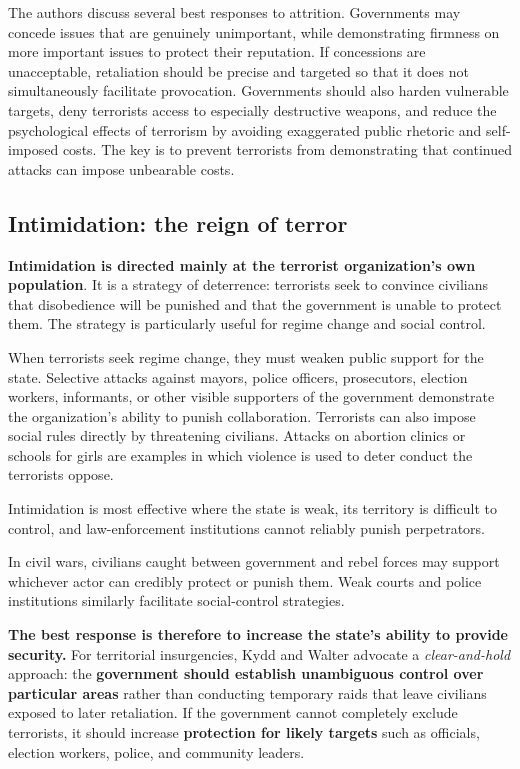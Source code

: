 The authors discuss several best responses to attrition. Governments may concede issues that are genuinely unimportant, while demonstrating firmness on more important issues to protect their reputation. If concessions are unacceptable, retaliation should be precise and targeted so that it does not simultaneously facilitate provocation. Governments should also harden vulnerable targets, deny terrorists access to especially destructive weapons, and reduce the psychological effects of terrorism by avoiding exaggerated public rhetoric and self-imposed costs. The key is to prevent terrorists from demonstrating that continued attacks can impose unbearable costs.

\subsection{Intimidation: the reign of terror}

\textbf{Intimidation is directed mainly at the terrorist organization's own population}. It is a strategy of deterrence: terrorists seek to convince civilians that disobedience will be punished and that the government is unable to protect them. The strategy is particularly useful for regime change and social control.

When terrorists seek regime change, they must weaken public support for the state. Selective attacks against mayors, police officers, prosecutors, election workers, informants, or other visible supporters of the government demonstrate the organization's ability to punish collaboration. Terrorists can also impose social rules directly by threatening civilians. Attacks on abortion clinics or schools for girls are examples in which violence is used to deter conduct the terrorists oppose.

Intimidation is most effective where the state is weak, its territory is difficult to control, and law-enforcement institutions cannot reliably punish perpetrators.

In civil wars, civilians caught between government and rebel forces may support whichever actor can credibly protect or punish them. Weak courts and police institutions similarly facilitate social-control strategies.

\textbf{The best response is therefore to increase the state's ability to provide security.} For territorial insurgencies, Kydd and Walter advocate a \textit{clear-and-hold} approach: the \textbf{government should establish unambiguous control over particular areas} rather than conducting temporary raids that leave civilians exposed to later retaliation. If the government cannot completely exclude terrorists, it should increase \textbf{protection for likely targets} such as officials, election workers, police, and community leaders.

